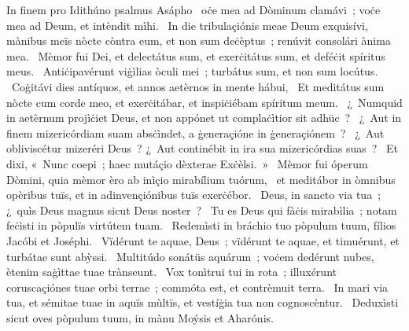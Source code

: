 { In finem pro Idithúno psalmus Asápho}
{%
~oċe mea ad Dòminum clamávi~; voċe mea ad Deum, et intèndit mìhi. 
~In die tribulaçiónis meae Deum exquisívi, mànibus meïs nòcte còntra eum, et non sum deċèptus~; renúvit consolári ànima mea. 
~Mèmor fui Dei, et delectátus sum, et exerċitátus sum, et deféċit spíritus meus. 
~Antiċipavérunt viġìlias òculi mei~; turbátus sum, et non sum locútus. 
~Coġitávi dies antíquos, et annos aetèrnos in mente hábui, 
~Et meditátus sum nòcte cum corde meo, et exerċitábar, et inspiċiébam spíritum meum. 
~¿~Numquid in aetèrnum projìċiet Deus, et non appónet ut complaċìtior sit adhüc~? 
~¿~Aut in finem mizericórdiam suam absċìndet, a ġeneraçióne in ġeneraçiónem~? 
~¿~Aut obliviscétur mizeréri Deus~? ¿~Aut continébit in ira sua mizericórdias suas~? 
~Et dixi, «~Nunc coepi~; haec mutáçio dèxterae Exċèlsi.~»
~Mèmor fui óperum Dòmini, quia mèmor èro ab inìçio mirabílium tuórum, 
~et meditábor in òmnibus opèribus tuïs, et in adinvençiónibus tuïs exerċébor. 
~Deus, in sancto via tua~; ¿~quìs Deus magnus sicut Deus noster~? 
~Tu es Deus qui fàċis mirabìlia~; notam feċìsti in pòpulïs virtútem tuam. 
~Redemìsti in bráchio tuo pòpulum tuum, fílios Jacóbi et Joséphi. 
~Vïdérunt te aquae, Deus~; vïdérunt te aquae, et timuérunt, et turbátae sunt abỳssi. 
~Multitúdo sonátüs aquárum~; voċem dedérunt nubes, ètenim saġìttae tuae trànseunt. 
~Vox tonìtrui tui in rota~; illuxérunt coruscaçiónes tuae orbi terrae~; commóta est, et contrèmuit terra. 
~In mari via tua, et sémitae tuae in aquïs mùltïs, et vestíġia tua non cognoscèntur. 
~Deduxìsti sicut oves pòpulum tuum, in mànu Moýsis et Aharónis. 
}
